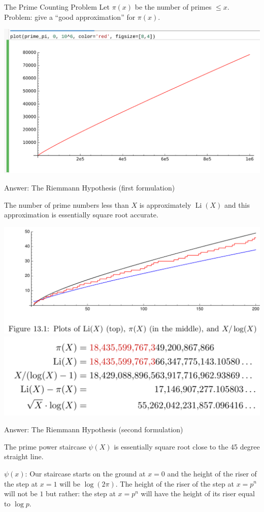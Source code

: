 \documentclass{beamer}
\DeclareMathOperator{\Li}{Li}
\begin{document}
\begin{frame}{The Prime Counting Problem}
  Let $\pi(x)$ be the number of primes $\leq x$.\\
  Problem: give a ``good approximation'' for $\pi(x)$.
  \vfill

  \includegraphics[width=.98\textwidth]{pics/prime-pi-1000000.png}

\end{frame}

\begin{frame}{Answer: The Riemmann Hypothesis (first formulation)}
  \begin{block}{}
    The number of prime numbers less than $X$ is
    approximately $\Li(X)$ and this approximation is essentially square
    root accurate.
  \end{block}
  \begin{center}
    \includegraphics[width=.5\textwidth]{pics/plot-pi-Li.png}
    \includegraphics[width=.5\textwidth]{pics/ten24.png}
  \end{center}
\end{frame}

\begin{frame}{Answer: The Riemmann Hypothesis  (second formulation)}
  \begin{block}{}
    The prime power staircase $\psi(X)$ is essentially square root close
    to the 45 degree straight line.
  \end{block}

  $\psi(x)$: Our staircase starts on the ground at $x=0$ and the height of the
  riser of the step at $x=1$ will be $\log(2\pi)$. The height of the
  riser of the step at $x=p^n$ will not be $1$
  but rather: the step at $x=p^n$ will have the height of its riser
  equal to $\log p$.


\end{frame}
\end{document}
